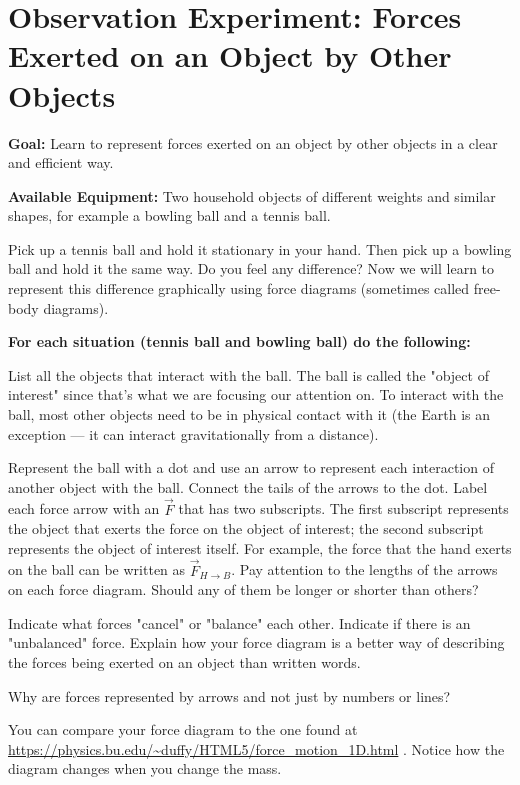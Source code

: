 
\section{Observation Experiment: Forces Exerted on an Object by	Other Objects}

\textbf{Goal:} Learn to represent forces exerted on an object by other objects in a clear and efficient way.

\textbf{Available Equipment:} Two household objects of different weights and similar shapes, for example a bowling ball and a tennis ball.

Pick up a tennis ball and hold it stationary in your hand. Then pick up a bowling ball and hold it the same way. Do you feel any difference? Now we will learn to represent this difference graphically using force diagrams (sometimes called free-body diagrams).

\textbf{For each situation (tennis ball and bowling ball) do the following:}
\begin{steps}
	\item List all the objects that interact with the ball.  The ball is called the "object of interest" since that's what we are focusing our attention on.  To interact with the ball, most other objects need to be in physical contact with it (the Earth is an exception --- it can interact gravitationally from a distance).
	
	\item Represent the ball with a dot and use an arrow to represent each interaction of another object with the ball. Connect the tails of the arrows to the dot. Label each force arrow with an $\vec{F}$ that has two subscripts. The first subscript represents the object that exerts the force on the object of interest; the second subscript represents the object of interest itself. For example, the force that the hand exerts on the ball can be written as $\vec{F}_{H \rightarrow B}$. Pay attention to the lengths of the arrows on each force diagram.  Should any of them be longer or shorter than others?
	
	\item Indicate what forces "cancel" or "balance" each other. Indicate if there is an "unbalanced" force. Explain how your force diagram is a better way of describing the forces being exerted on an object than written words.
	
	\item Why are forces represented by arrows and not just by numbers or lines?
	
	\item You can compare your force diagram to the one found at \url{https://physics.bu.edu/~duffy/HTML5/force_motion_1D.html} . Notice how the diagram changes when you change the mass.
\end{steps}

